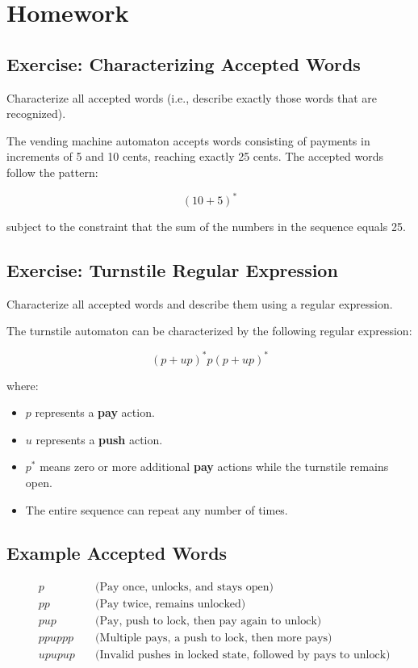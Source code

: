 \documentclass{article}
\begin{document}
\newpage

\section{Homework}

\subsection{Exercise: Characterizing Accepted Words}

Characterize all accepted words (i.e., describe exactly those words that are recognized).

The vending machine automaton accepts words consisting of payments in increments of 5 and 10 cents, reaching exactly 25 cents. The accepted words follow the pattern:

\[
(10 + 5)^* 
\]

subject to the constraint that the sum of the numbers in the sequence equals 25. 

\subsection{Exercise: Turnstile Regular Expression}

Characterize all accepted words and describe them using a regular expression.

The turnstile automaton can be characterized by the following regular expression:

\[
(p + u p)^* p (p + u p)^*
\]

where:
\begin{itemize}
    \item \( p \) represents a \textbf{pay} action.
    \item \( u \) represents a \textbf{push} action.
    \item \( p^* \) means zero or more additional \textbf{pay} actions while the turnstile remains open.
    \item The entire sequence can repeat any number of times.
\end{itemize}

\subsection*{Example Accepted Words}
\begin{align*}
    & p &\quad \text{(Pay once, unlocks, and stays open)} \\
    & p p &\quad \text{(Pay twice, remains unlocked)} \\
    & p u p &\quad \text{(Pay, push to lock, then pay again to unlock)} \\
    & p p u p p p &\quad \text{(Multiple pays, a push to lock, then more pays)} \\
    & u p u p u p &\quad \text{(Invalid pushes in locked state, followed by pays to unlock)}
\end{align*}
\end{document}
